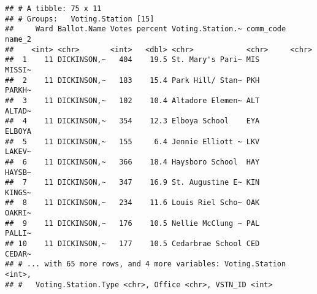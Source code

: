 \documentclass[
]{article}
\newenvironment{Shaded}{\begin{snugshade}}{\end{snugshade}}
\newcommand{\CommentTok}[1]{\textcolor[rgb]{0.56,0.35,0.01}{\textit{#1}}}
\newcommand{\DataTypeTok}[1]{\textcolor[rgb]{0.13,0.29,0.53}{#1}}
\newcommand{\DecValTok}[1]{\textcolor[rgb]{0.00,0.00,0.81}{#1}}
\newcommand{\KeywordTok}[1]{\textcolor[rgb]{0.13,0.29,0.53}{\textbf{#1}}}
\newcommand{\NormalTok}[1]{#1}
\newcommand{\OperatorTok}[1]{\textcolor[rgb]{0.81,0.36,0.00}{\textbf{#1}}}
\newcommand{\StringTok}[1]{\textcolor[rgb]{0.31,0.60,0.02}{#1}}
\begin{document}
\begin{Shaded}
\end{Shaded}

\begin{verbatim}
## # A tibble: 75 x 11
## # Groups:   Voting.Station [15]
##     Ward Ballot.Name Votes percent Voting.Station.~ comm_code name_2
##    <int> <chr>       <int>   <dbl> <chr>            <chr>     <chr> 
##  1    11 DICKINSON,~   404    19.5 St. Mary's Pari~ MIS       MISSI~
##  2    11 DICKINSON,~   183    15.4 Park Hill/ Stan~ PKH       PARKH~
##  3    11 DICKINSON,~   102    10.4 Altadore Elemen~ ALT       ALTAD~
##  4    11 DICKINSON,~   354    12.3 Elboya School    EYA       ELBOYA
##  5    11 DICKINSON,~   155     6.4 Jennie Elliott ~ LKV       LAKEV~
##  6    11 DICKINSON,~   366    18.4 Haysboro School  HAY       HAYSB~
##  7    11 DICKINSON,~   347    16.9 St. Augustine E~ KIN       KINGS~
##  8    11 DICKINSON,~   234    11.6 Louis Riel Scho~ OAK       OAKRI~
##  9    11 DICKINSON,~   176    10.5 Nellie McClung ~ PAL       PALLI~
## 10    11 DICKINSON,~   177    10.5 Cedarbrae School CED       CEDAR~
## # ... with 65 more rows, and 4 more variables: Voting.Station <int>,
## #   Voting.Station.Type <chr>, Office <chr>, VSTN_ID <int>
\end{verbatim}
\end{document}
